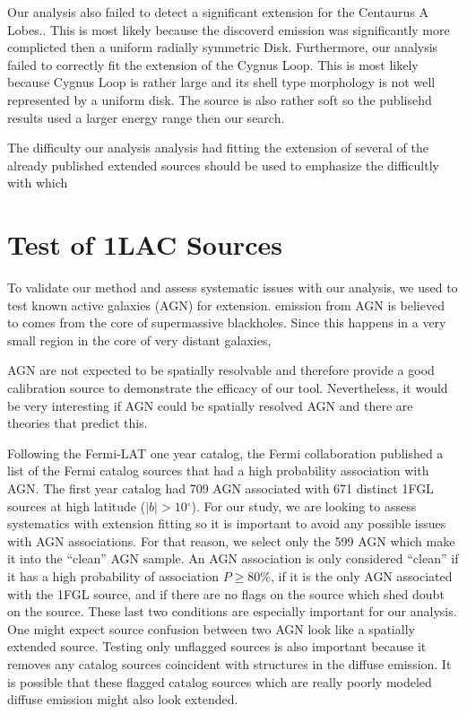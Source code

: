 \documentclass[preprint]{aastex}
\newcommand{\gev}{\text{GeV}\xspace}
\renewcommand{\deg}{\ensuremath{^\circ}\xspace}
\newcommand{\pointlike}{\text{\em pointlike}\xspace}
\begin{document}
Our analysis also failed to detect a significant extension for the
Centaurus A Lobes.\cite{CenA paper}. This is most likely because the
discoverd emission was significantly more complicted then a uniform
radially symmetric Disk.  Furthermore, our analysis failed to correctly
fit the extension of the Cygnus Loop\cite{Cygnus Loop Paper}.  This is
most likely because Cygnus Loop is rather large and its shell type
morphology is not well represented by a uniform disk. The source is
also rather soft so the publisehd results used a larger energy range
then our search.


The difficulty our analysis analysis had fitting the extension of several
of the already published extended sources should be used to emphasize
the difficultly with which

\section{Test of 1LAC Sources}

To validate our method and assess systematic issues with our
analysis, we used \pointlike to test known active galaxies (AGN) for extension.
\gev emission from AGN is believed to comes from the
core of supermassive blackholes. Since this happens in a very small region
in the core of very distant galaxies,

AGN are not expected to be spatially resolvable and therefore
provide a good calibration source to demonstrate the efficacy of our
tool. Nevertheless, it would be very interesting if AGN could be
spatially resolved AGN and there are theories that predict
this\cite{pair_halo_paper}.

Following the Fermi-LAT one year catalog, the Fermi collaboration
published a list of the Fermi catalog sources that had a high probability
association with AGN. The first year catalog had 709 AGN associated with
671 distinct 1FGL sources at high latitude ($|b|>10\deg$).  For our
study, we are looking to assess systematics with extension fitting so
it is important to avoid any possible issues with AGN associations.
For that reason, we select only the 599 AGN which make it into the
``clean'' AGN sample. An AGN association is only considered ``clean''
if it has a high probability of association $P\ge 80\%$, if it is the
only AGN associated with the 1FGL source, and if there are no flags
on the source which shed doubt on the source\cite{first_cat}. These last two
conditions are especially important for our analysis. One might expect
source confusion between two AGN look like a spatially extended source.
Testing only unflagged sources is also important because it removes
any catalog sources coincident with structures in the diffuse emission.
It is possible that these flagged catalog sources which are really poorly
modeled diffuse emission might also look extended.
\end{document}
